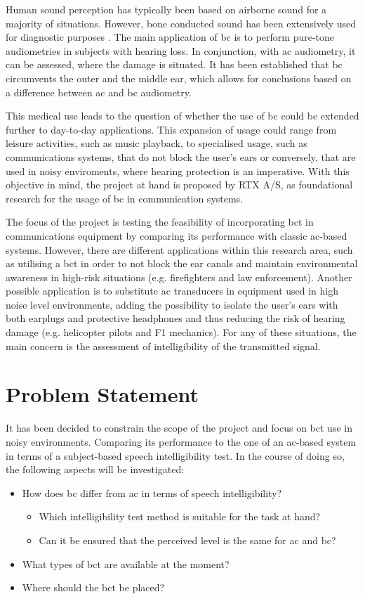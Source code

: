 Human sound perception has typically been based on airborne sound for a majority of situations. However, bone conducted sound has been extensively used for diagnostic purposes \citep{iso_389-3}. The main application of \gls{bc} is to perform pure-tone audiometries in subjects with hearing loss. In conjunction, with \gls{ac} audiometry, it can be assessed, where the damage is situated. It has been established that \gls{bc} circumvents the outer and the middle ear, which allows for conclusions based on a difference between \gls{ac} and \gls{bc} audiometry.

This medical use leads to the question of whether the use of \gls{bc} could be extended further to day-to-day applications. This expansion of usage could range from leisure activities, such as music playback, to specialised usage, such as communications systems, that do not block the user's ears or conversely, that are used in noisy enviroments, where hearing protection is an imperative. With this objective in mind, the project at hand is proposed by RTX A/S, as foundational research for the usage of \gls{bc} in communication systems.

The focus of the project is testing the feasibility of incorporating \gls{bct} in communications equipment by comparing its performance with classic \gls{ac}-based systems. However, there are different applications within this research area, such as utilising a \gls{bct} in order to not block the ear canals and maintain environmental awareness in high-risk situations (e.g. firefighters and law enforcement). Another possible application is to substitute \gls{ac} transducers in equipment used in high noise level environments, adding the possibility to isolate the user's ears with both earplugs and protective headphones and thus reducing the risk of hearing damage (e.g. helicopter pilots and F1 mechanics). For any of these situations, the main concern is the assessment of intelligibility of the transmitted signal.

\section{Problem Statement}
\label{sec:problem_statement}
It has been decided to constrain the scope of the project and focus on \gls{bct} use in noisy environments. Comparing its performance to the one of an \gls{ac}-based system in terms of a subject-based speech intelligibility test. In the course of doing so, the following aspects will be investigated:
\begin{itemize}
\item How does \gls{bc} differ from \gls{ac} in terms of speech intelligibility?
\begin{itemize}
\item Which intelligibility test method is suitable for the task at hand?
\item Can it be ensured that the perceived level is the same for \gls{ac} and \gls{bc}?
\end{itemize}
\item What types of \gls{bct} are available at the moment?
\item Where should the \gls{bct} be placed?
\end{itemize}